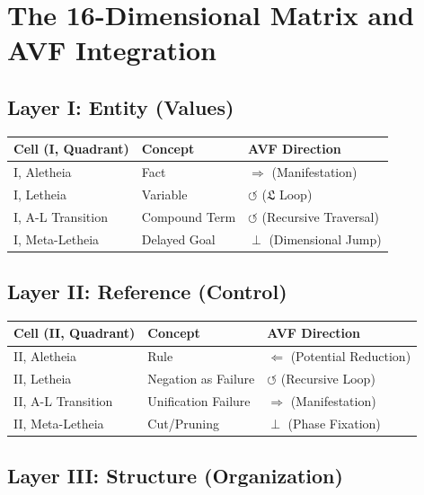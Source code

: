 \documentclass[12pt,a4paper]{article}
\theoremstyle{definition}
\newcommand{\letheia}{\mathfrak{L}}
\begin{document}
\section{The 16-Dimensional Matrix and AVF Integration}
\label{sec:matrix}

\subsection{Layer I: Entity (Values)}

\begin{table}[h]
\centering
\small
\begin{tabular}{|l|l|l|}
\hline
\textbf{Cell (I, Quadrant)} & \textbf{Concept} & \textbf{AVF Direction} \\
\hline
I, Aletheia & Fact & $\Rightarrow$ (Manifestation) \\
I, Letheia & Variable & $\circlearrowleft$ ($\letheia$ Loop) \\
I, A-L Transition & Compound Term & $\circlearrowleft$ (Recursive Traversal) \\
I, Meta-Letheia & Delayed Goal & $\perp$ (Dimensional Jump) \\
\hline
\end{tabular}
\end{table}

\subsection{Layer II: Reference (Control)}

\begin{table}[h]
\centering
\small
\begin{tabular}{|l|l|l|}
\hline
\textbf{Cell (II, Quadrant)} & \textbf{Concept} & \textbf{AVF Direction} \\
\hline
II, Aletheia & Rule & $\Leftarrow$ (Potential Reduction) \\
II, Letheia & Negation as Failure & $\circlearrowleft$ (Recursive Loop) \\
II, A-L Transition & Unification Failure & $\Rightarrow$ (Manifestation) \\
II, Meta-Letheia & Cut/Pruning & $\perp$ (Phase Fixation) \\
\hline
\end{tabular}
\end{table}

\subsection{Layer III: Structure (Organization)}
\end{document}
